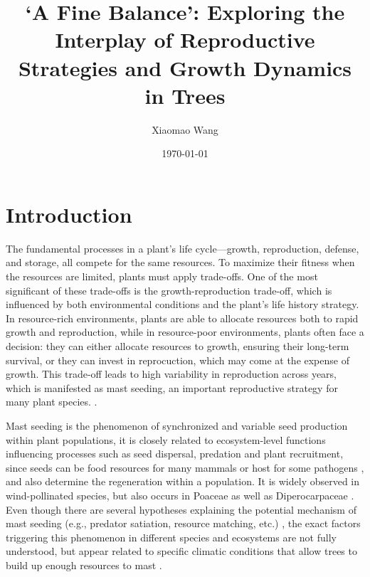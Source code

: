 \documentclass[11pt,letter]{article}
\begin{document}
\title{`A Fine Balance': Exploring the Interplay of Reproductive Strategies and Growth Dynamics in Trees}
\author{Xiaomao Wang} 
\date{\today}
\maketitle

\setlength{\parindent}{0pt}
\setlength{\parskip}{3pt}

\section{Introduction} 
The fundamental processes in a plant's life cycle—growth, reproduction, defense, and storage, all compete for the same resources. To maximize their fitness when the resources are limited, plants must apply trade-offs. One of the most significant of these trade-offs is the growth-reproduction trade-off, which is influenced by both environmental conditions and the plant's life history strategy. In resource-rich environments, plants are able to allocate resources both to rapid growth and reproduction, while in resource-poor environments, plants often face a decision: they can either allocate resources to growth, ensuring their long-term survival, or they can invest in reprocuction, which may come at the expense of growth. This trade-off leads to high variability in reproduction across years, which is manifested as mast seeding, an important reproductive strategy for many plant species. \citep{pearse2016mechanisms}.\par
Mast seeding is the phenomenon of synchronized and variable seed production within plant populations, it is closely related to ecosystem-level functions influencing processes such as seed dispersal, predation and plant recruitment, since seeds can be food resources for many mammals or host for some pathogens  \citep{janzen1971seed, kelly1994evolutionary, davies2024seed}, and also determine the regeneration within a population. It is widely observed in wind-pollinated species, but also occurs in Poaceae as well as Diperocarpaceae \citep{kelly2002mast}. Even though there are several hypotheses explaining the potential mechanism of mast seeding (e.g., predator satiation, resource matching, etc.)  \citep{koenig2021brief}, the exact factors triggering this phenomenon in different species and ecosystems are not fully understood, but appear related to specific climatic conditions that allow trees to build up enough resources to mast  \citep{pearse2016mechanisms}. \par
\end{document}
